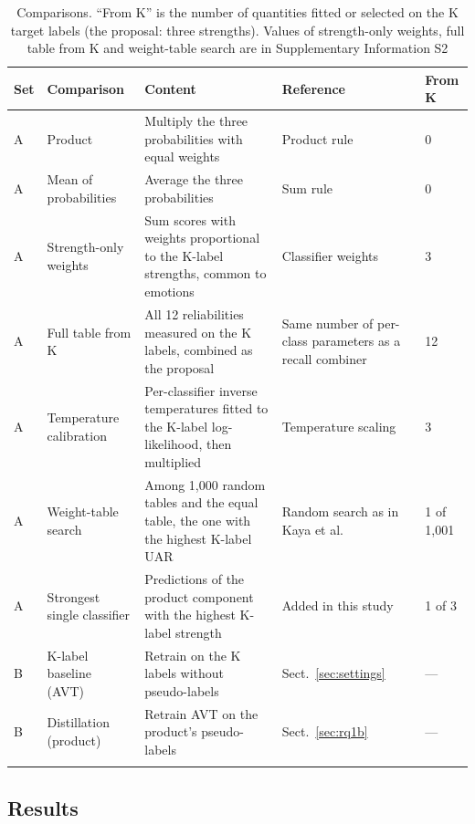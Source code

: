 \begin{table}[t]
\caption{Comparisons. ``From K'' is the number of quantities fitted or selected on the K target labels (the proposal: three strengths). Values of strength-only weights, full table from K and weight-table search are in Supplementary Information S2}\label{tab:comparators}
\footnotesize\setlength{\tabcolsep}{4pt}
\begin{tabular}{@{}lp{2.8cm}p{4.0cm}p{2.5cm}l@{}}
\toprule
Set & Comparison & Content & Reference & From K \\
\midrule
A & Product & Multiply the three probabilities with equal weights & Product rule \cite{kittler1998} & 0 \\
A & Mean of probabilities & Average the three probabilities & Sum rule \cite{kittler1998} & 0 \\
A & Strength-only weights & Sum scores with weights proportional to the K-label strengths, common to emotions & Classifier weights \cite{kuncheva2014} & 3 \\
A & Full table from K & All 12 reliabilities measured on the K labels, combined as the proposal & Same number of per-class parameters as a recall combiner \cite{kuncheva2014} & 12 \\
A & Temperature calibration & Per-classifier inverse temperatures fitted to the K-label log-likelihood, then multiplied & Temperature scaling \cite{guo2017calibration} & 3 \\
A & Weight-table search & Among 1,000 random tables and the equal table, the one with the highest K-label UAR & Random search as in Kaya et al.\ \cite{kaya2017} & 1 of 1,001 \\
A & Strongest single classifier & Predictions of the product component with the highest K-label strength & Added in this study & 1 of 3 \\
B & K-label baseline (AVT) & Retrain on the K labels without pseudo-labels & Sect.~\ref{sec:settings} & --- \\
B & Distillation (product) & Retrain AVT on the product's pseudo-labels & Sect.~\ref{sec:rq1b} & --- \\
\botrule
\end{tabular}
\end{table}

\subsection{Results}\label{sec:rq2-results}

